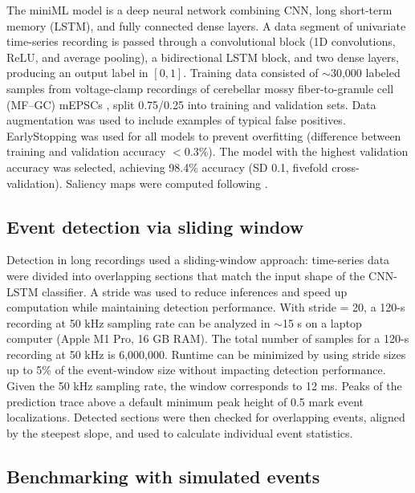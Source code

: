 \documentclass[9pt,lineno]{article}
\begin{document}
The miniML model is a deep neural network combining CNN, long short-term memory (LSTM), and fully connected dense layers. A data segment of univariate time-series recording is passed through a convolutional block (1D convolutions, ReLU, and average pooling), a bidirectional LSTM block, and two dense layers, producing an output label in $[0, 1]$. Training data consisted of $\sim$30{,}000 labeled samples from voltage-clamp recordings of cerebellar mossy fiber-to-granule cell (MF--GC) mEPSCs \citep{Delvendahl2019}, split 0.75/0.25 into training and validation sets. Data augmentation was used to include examples of typical false positives. EarlyStopping was used for all models to prevent overfitting (difference between training and validation accuracy $<0.3\%$). The model with the highest validation accuracy was selected, achieving 98.4\% accuracy (SD 0.1, fivefold cross-validation). Saliency maps were computed following \citet{Simonyan2013}.

\subsection{Event detection via sliding window}

Detection in long recordings used a sliding-window approach: time-series data were divided into overlapping sections that match the input shape of the CNN-LSTM classifier. A stride was used to reduce inferences and speed up computation while maintaining detection performance. With stride = 20, a 120-s recording at 50 kHz sampling rate can be analyzed in $\sim$15 s on a laptop computer (Apple M1 Pro, 16 GB RAM). The total number of samples for a 120-s recording at 50 kHz is 6{,}000{,}000. Runtime can be minimized by using stride sizes up to 5\% of the event-window size without impacting detection performance. Given the 50 kHz sampling rate, the window corresponds to 12 ms. Peaks of the prediction trace above a default minimum peak height of 0.5 mark event localizations. Detected sections were then checked for overlapping events, aligned by the steepest slope, and used to calculate individual event statistics.

\subsection{Benchmarking with simulated events}
\end{document}
